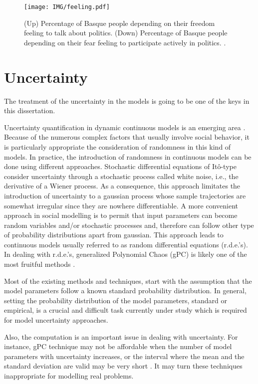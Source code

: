 \begin{figure}[ht]
  \centering
  \texttt{[image: IMG/feeling.pdf]}
  \caption{(Up) Percentage of Basque people depending on their freedom feeling to talk about politics. (Down) Percentage of Basque people depending on their fear feeling to participate actively in politics. \cite{eusko}.}
  \label{feeling}
\end{figure}    

\section{Uncertainty}
The treatment of the uncertainty in the models is going to be one of the keys in this dissertation.

Uncertainty quantification in dynamic continuous models is an emerging area \cite{maitre}. Because of the numerous complex factors that usually involve social behavior, it is particularly appropriate the consideration of randomness in this kind of models. In practice, the introduction of randomness in continuous models can be done using different approaches. Stochastic differential  equations of It\^{o}-type consider uncertainty through a stochastic process called white noise, i.e., the derivative of a Wiener process. As a consequence, this approach limitates the introduction of uncertainty to a gaussian process whose sample trajectories are somewhat irregular since they are nowhere differentiable. A more convenient approach in social modelling is to permit that input parameters can become random variables and/or stochastic processes and, therefore can follow other type of probability distributions apart from gaussian. This approach leads to continuous models usually referred to as random differential equations (r.d.e.'s). In dealing with r.d.e.'s, generalized Polynomial Chaos (gPC) is likely one of the most fruitful methods \cite{Spanos, Xiu}.

Most of the existing methods and techniques, start with the assumption that the model parameters follow a known standard probability distribution. In general, setting the probability distribution of the model parameters, standard or empirical, is a crucial and difficult task currently under study which is required for model uncertainty approaches.

Also, the computation is an important issue in dealing with uncertainty. For instance, gPC technique may not be affordable when the number of model parameters with uncertainty increases, or the interval where the mean and the standard deviation are valid may be very short \cite{Benito}. It may turn these techniques inappropriate for modelling real problems. 

